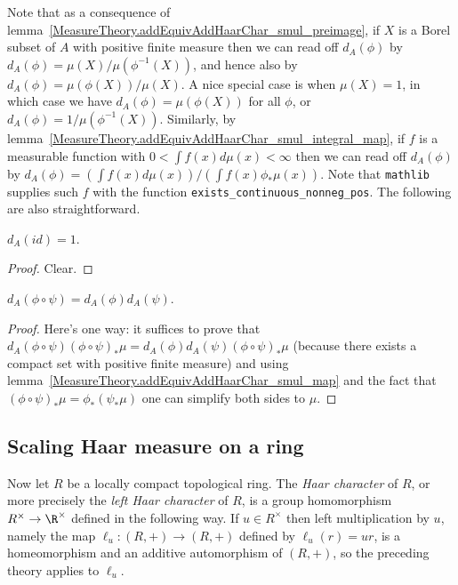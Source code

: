 Note that as a consequence of lemma~\ref{MeasureTheory.addEquivAddHaarChar_smul_preimage},
if $X$ is a Borel subset of $A$ with positive finite measure then we can read
off $d_A(\phi)$ by $d_A(\phi)=\mu(X)/\mu(\phi^{-1}(X))$, and hence also by
$d_A(\phi)=\mu(\phi(X))/\mu(X)$. A nice special case is when
$\mu(X)=1$, in which case we have $d_A(\phi)=\mu(\phi(X))$ for all $\phi$,
or $d_A(\phi)=1/\mu(\phi^{-1}(X))$.
Similarly, by lemma~\ref{MeasureTheory.addEquivAddHaarChar_smul_integral_map},
if $f$ is a measurable function with $0<\int f(x)d\mu(x)<\infty$ then
we can read off $d_A(\phi)$ by $d_A(\phi)=(\int f(x)d\mu(x))/(\int f(x)\phi_*\mu(x))$.
Note that {\tt mathlib} supplies such $f$ with the function {\tt exists\_continuous\_nonneg\_pos}.
The following are also straightforward.

\begin{lemma}
  \label{MeasureTheory.addEquivAddHaarChar_refl}
  \leanok
  $d_A(id)=1.$
\end{lemma}
\begin{proof}
  \leanok
  Clear.
\end{proof}

\begin{lemma}
  \label{MeasureTheory.addEquivAddHaarChar_trans}
  \leanok
  $d_A(\phi\circ\psi)=d_A(\phi)d_A(\psi).$
\end{lemma}
\begin{proof}
  \leanok
  Here's one way: it suffices to prove that
  $d_A(\phi\circ\psi)(\phi\circ\psi)_*\mu=d_A(\phi)d_A(\psi)(\phi\circ\psi)_*\mu$
  (because there exists a compact set with positive finite measure)
  and using lemma~\ref{MeasureTheory.addEquivAddHaarChar_smul_map}
  and the fact that $(\phi\circ\psi)_*\mu=\phi_*(\psi_*\mu)$
  one can simplify both sides to $\mu$.
\end{proof}

\subsection{Scaling Haar measure on a ring}

Now let $R$ be a locally compact topological ring. The \emph{Haar character} of $R$,
or more precisely the \emph{left Haar character} of $R$, is a group homomorphism
$R^\times\to\R^\times$ defined in the following way. If $u\in R^\times$ then left multiplication
by $u$, namely the map $\ell_u:(R,+)\to(R,+)$ defined by $\ell_u(r)=ur$, is a homeomorphism and
an additive automorphism of $(R,+)$, so the preceding theory applies to $\ell_u$.

